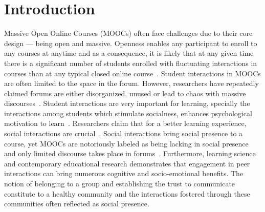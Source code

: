 \documentclass[manuscript,screen,review]{acmart}
\begin{document}



\maketitle

\section{Introduction}
Massive Open Online Courses (MOOCs) often face challenges due to their core design --- being open and massive. Openness enables any participant to enroll to any courses at anytime and as a consequence, it is likely that at any given time there is a significant number of students enrolled with fluctuating interactions in courses than at any typical closed online course~\cite{oleksandra2016untangling}. Student interactions in MOOCs are often limited to the space in the forum. However, researchers have repeatedly claimed forums are either disorganized, unused or lead to chaos with massive discourses~\cite{coetzee2014should}. Student interactions are very important for learning, specially the interactions among students which stimulate socialness, enhances psychological motivation to learn~\cite{coetzee2014should}. Researchers claim that for a better learning experience, social interactions are crucial~\cite{yang2007students}. Social interactions bring social presence to a course, yet MOOCs are notoriously labeled as being lacking in social presence and only limited discourse takes place in forums~\cite{antonaci2019gamification}. Furthermore,
learning science and contemporary educational research demonstrates that engagement in peer interactions can bring numerous cognitive and socio-emotional benefits. The notion of belonging to a group and establishing the trust to communicate constitute to a healthy community and the interactions fostered through these communities often reflected as social presence. 
\end{document}
